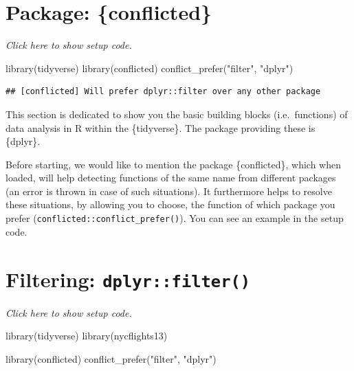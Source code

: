 \documentclass[]{book}
\newenvironment{Shaded}{}{}
\newcommand{\KeywordTok}[1]{\textcolor[rgb]{0.00,0.00,1.00}{#1}}
\newcommand{\NormalTok}[1]{#1}
\newcommand{\StringTok}[1]{\textcolor[rgb]{0.00,0.50,0.50}{#1}}
\begin{document}
\hypertarget{package-conflicted}{%
\section{Package: \{conflicted\}}\label{package-conflicted}}

\emph{Click here to show setup code.}

\begin{Shaded}
\begin{Highlighting}[]
\KeywordTok{library}\NormalTok{(tidyverse)}
\KeywordTok{library}\NormalTok{(conflicted)}
\KeywordTok{conflict_prefer}\NormalTok{(}\StringTok{"filter"}\NormalTok{, }\StringTok{"dplyr"}\NormalTok{)}
\end{Highlighting}
\end{Shaded}

\begin{verbatim}
## [conflicted] Will prefer dplyr::filter over any other package
\end{verbatim}

This section is dedicated to show you the basic building blocks (i.e.~functions) of data analysis in R within the \{tidyverse\}.
The package providing these is \{dplyr\}.

Before starting, we would like to mention the package \{conflicted\}, which when loaded, will help detecting functions of the same name from different packages (an error is thrown in case of such situations).
It furthermore helps to resolve these situations, by allowing you to choose, the function of which package you prefer (\texttt{conflicted::conflict\_prefer()}).
You can see an example in the setup code.

\hypertarget{filtering-dplyrfilter}{%
\section{\texorpdfstring{Filtering: \texttt{dplyr::filter()}}{Filtering: dplyr::filter()}}\label{filtering-dplyrfilter}}

\emph{Click here to show setup code.}

\begin{Shaded}
\begin{Highlighting}[]
\KeywordTok{library}\NormalTok{(tidyverse)}
\KeywordTok{library}\NormalTok{(nycflights13)}

\KeywordTok{library}\NormalTok{(conflicted)}
\KeywordTok{conflict_prefer}\NormalTok{(}\StringTok{"filter"}\NormalTok{, }\StringTok{"dplyr"}\NormalTok{)}
\end{Highlighting}
\end{Shaded}
\end{document}
